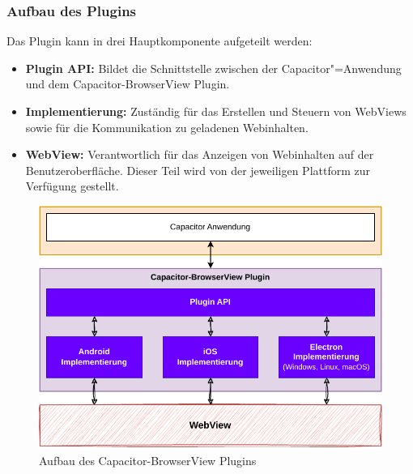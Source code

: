 \subsubsection{Aufbau des Plugins}

Das Plugin kann in drei Hauptkomponente aufgeteilt werden:

\begin{itemize}
  \item \textbf{Plugin API:} Bildet die Schnittstelle zwischen der Capacitor"=Anwendung und dem Capacitor-BrowserView Plugin.
  \item \textbf{Implementierung:} Zuständig für das Erstellen und Steuern von WebViews sowie für die Kommunikation zu geladenen Webinhalten.
  \item \textbf{WebView:}
  Verantwortlich für das Anzeigen von Webinhalten auf der Benutzeroberfläche.
  Dieser Teil wird von der jeweiligen Plattform zur Verfügung gestellt.
  \cite{android:api, ios:api, electron:docs}
\end{itemize}

\begin{figure}[H]
  \centering
  \includegraphics[width=\textwidth]{assets/03_Capacitor-BrowserView/02_Aufbau.drawio.pdf}
  \caption[Capacitor-BrowserView / Aufbau]{Aufbau des Capacitor-BrowserView Plugins}
\end{figure}
